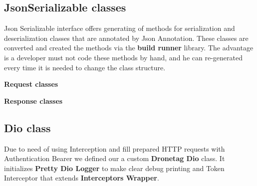 \subsection{JsonSerializable classes}\label{subsec:jsonserializable-classes}
Json Serializable interface offers generating of  methods for serialization and deserialization classes that are annotated by Json Annotation.
These classes are converted and created the methods via the \textbf{build runner} library.
The advantage is a developer must not code these methods by hand, and he can re-generated every time it is needed to change the class structure.

\textbf{Request classes}

\textbf{Response classes}


\subsection{Dio class}\label{subsec:dio-class}
Due to need of using Interception and fill prepared HTTP requests with Authentication Bearer we defined our a custom \textbf{Dronetag Dio} class.
It initializes \textbf{Pretty Dio Logger} to make clear debug printing and Token Interceptor that extends \textbf{Interceptors Wrapper}.
